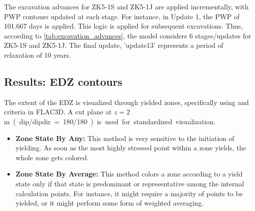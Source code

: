 The excavation advances for ZK5-1S and ZK5-1J are applied incrementally, with \gls{PWP} contours updated at each stage. For instance, in Update 1, the \gls{PWP} of 101.667 days is applied. This logic is applied for subsequent excavations.
Thus, according to \autoref{tab:excavation_advances}, the model considers 6 stages/updates for ZK5-1S and ZK5-1J.  The final update, 'update13' represents a period of relaxation of 10 years.

\subsection{Results: EDZ contours}
The extent of the \gls{EDZ} is visualized through yielded zones, specifically using  and  criteria in FLAC3D. A cut plane at $z=2$ \unit\meter~ (dip/dipdir = 180/180) is used for standardized visualization.
\begin{itemize}%
    \item \textbf{Zone State By Any:} This method is very sensitive to the initiation of yielding. As soon as the most highly stressed point within a zone yields, the whole zone gets colored.
    \item \textbf{Zone State By Average:} This method colors a zone according to a yield state only if that state is predominant or representative among the internal calculation points. For instance, it might require a majority of points to be yielded, or it might perform some form of weighted averaging.
\end{itemize}




